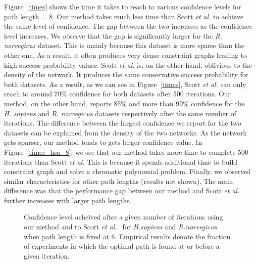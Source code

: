 \documentclass{ws-procs11x85}
\newcommand{\goodgap}{
        \hspace{\subfigtopskip}
        \hspace{\subfigbottomskip}
}
\begin{document}
Figure~\ref{times} shows the time it takes to reach to various
confidence levels for path length = 8.  Our method takes much less
time than Scott {\it et al.}  to achieve the same level of confidence.
The gap between the two increases as the confidence level increases.
We observe that the gap is significantly larger for the {\it R.
  norvegicus} dataset. This is mainly because this dataset is more
sparse than the other one. As a result, it often produces very dense
constraint graphs leading to high success probability values.  Scott
{\it et al.} is, on the other hand, oblivious to the density of the
network. It produces the same conservative success probability for
both datasets. As a result, as we can see in Figure~\ref{times}, Scott
{\it et al.} can only reach to around 70\% confidence for both
datasets after 500 iterations. Our method, on the other hand, reports
85\% and more than 99\% confidence for the {\it H.  sapiens} and {\it
  R.  norvegicus} datasets respectively after the same number of
iterations. The difference between the largest confidence we report
for the two datasets can be explained from the density of the two
networks. As the network gets sparser, our method tends to gets larger
confidence value.  In Figure~\ref{times_hsa_8}, we see that our method
takes more time to complete 500 iterations than Scott {\it et al.}
This is because it spends additional time to build constraint graph
and solve a chromatic polynomial problem. Finally, we observed similar
characteristics for other path lengths (results not shown). The main
difference was that the performance gap between our method and Scott
{\it et al.} further increases with larger path lengths.


\begin{figure}[t]
\centering
{}
\goodgap
{}
\caption{Confidence level acheived after a given number of iterations
  using our method and to Scott {\it et al.}~\cite{} for {\it H.sapiens} and
  {\it R.norvegicus} when path length is fixed at 6. Empirical results
  denote the fraction of experiments in which the optimal path is
  found at or before a given iteration.}
\label{iterations}
\end{figure}
\end{document}
